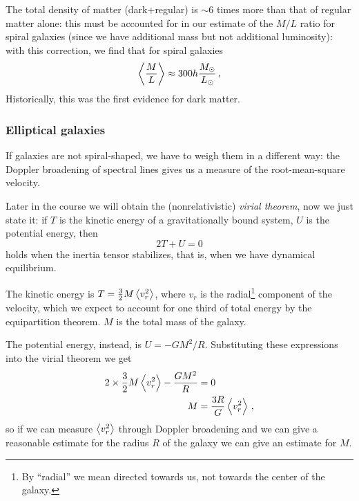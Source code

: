 \documentclass[main.tex]{subfiles}
\begin{document}
The total density of matter (dark+regular) is \(\sim 6\) times more than that of regular matter alone: this must be accounted for in our estimate of the \(M/L\) ratio for spiral galaxies (since we have additional mass but not additional luminosity):
with this correction, we find that for spiral galaxies
%
\begin{align}
\expval{\frac{M}{L}} \approx 300 h \frac{M_{\odot}}{L_{\odot}}
\,,
\end{align}
%
Historically, this was the first evidence for dark matter.

\subsubsection{Elliptical galaxies}

If galaxies are not spiral-shaped, we have to weigh them in a different way: the Doppler broadening of spectral lines gives us a measure of the root-mean-square velocity.

Later in the course we will obtain the (nonrelativistic) \emph{virial theorem}, now we just state it: if \(T\) is the kinetic energy of a gravitationally bound system, \(U\) is the potential energy, then
%
\begin{equation}
  2T + U = 0
\end{equation}
%
holds when the inertia tensor stabilizes, that is, when we have dynamical equilibrium.

The kinetic energy is \(T = \frac{3}{2} M \expval{v_r^2} \), where \(v_r\) is the radial\footnote{By ``radial'' we mean directed towards us, not towards the center of the galaxy.}
component of the velocity, which we expect to account for one third of total energy by the equipartition theorem.
\(M\) is the total mass of the galaxy.

The potential energy, instead, is \(U = - G M^2 /R\). Substituting these expressions into the virial theorem we get
%
\begin{align}
2 \times \frac{3}{2} M \expval{v_r^2} - \frac{GM^2}{R} &= 0  \\
M &= \frac{3R}{G} \expval{v_r^2}
\,,
\end{align}
%
so if we can measure \(\expval{v_r^2}\) through Doppler broadening and we can give a reasonable estimate for the radius \(R\) of the galaxy we can give an estimate for \(M\).
\end{document}
